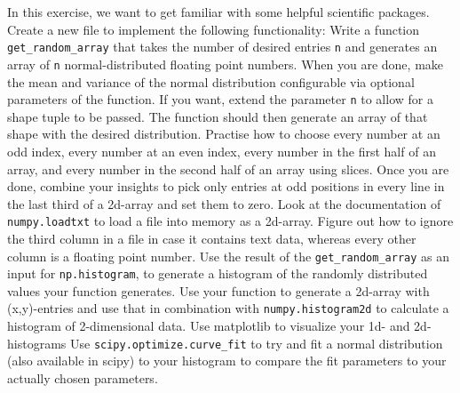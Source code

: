 \documentclass[]{erlangen-problemset}
\begin{document}
\begin{problem}[title={Using numpy and scipy for scientific calculation}]
In this exercise, we want to get familiar with some helpful scientific packages.
Create a new file to implement the following functionality:
\noindent
\Question Write a function \texttt{get\_random\_array} that takes the number of desired entries \texttt{n} and generates an array of  \texttt{n} normal-distributed floating point numbers. When you are done, make the mean and variance of the normal distribution configurable via optional parameters of the function. If you want, extend the parameter  \texttt{n} to allow for a shape tuple to be passed. The function should then generate an array of that shape with the desired distribution.
\Question Practise how to choose every number at an odd index, every number at an even index, every number in the first half of an array, and every number in the second half of an array using slices.
Once you are done, combine your insights to pick only entries at odd positions in every line in the last third of a 2d-array and set them to zero.
\Question Look at the documentation of  \texttt{numpy.loadtxt} to load a file into memory as a 2d-array. Figure out how to ignore the third column in a file in case it contains text data, whereas every other column is a floating point number.
\Question Use the result of the  \texttt{get\_random\_array} as an input for \texttt{np.histogram}, to generate a histogram of the randomly distributed values your function generates. Use your function to generate a 2d-array with (x,y)-entries and use that in combination with  \texttt{numpy.histogram2d} to calculate a histogram of 2-dimensional data.
\Question Use matplotlib to visualize your 1d- and 2d-histograms
\Question Use  \texttt{scipy.optimize.curve\_fit} to try and fit a normal distribution (also available in scipy) to your histogram to compare the fit parameters to your actually chosen parameters.
\end{problem}
\end{document}

